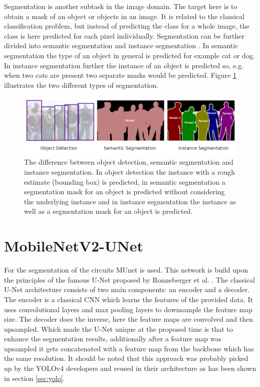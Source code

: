 \label{sec:segmentation}

Segmentation is another subtask in the image domain.
The target here is to obtain a mask of an object or objects in an image.
It is related to the classical classification problem, but instead of predicting the class for a whole image, the class is here predicted for each pixel individually.
Segmentation can be further divided into semantic segmentation \cite{semantic_segmentation} and instance segmentation \cite{mask_rcnn}.
In semantic segmentation the type of an object in general is predicted for example cat or dog.
In instance segmentation further the instance of an object is predicted so, e.g. when two cats are present two separate masks would be predicted.
Figure \ref{fig:instance_vs_semantic} illustrates the two different types of segmentation.

\begin{figure}
\begin{center}
    \includegraphics[width=16cm]{imgs/instance_vs_semantic_seg.png}
    \caption{The difference between object detection, semantic segmentation and instance segmentation. In object detection the instance with a rough estimate (bounding box) is predicted, in semantic segmentation a segmentation mask for an object is predicted without considering the underlying instance and in instance segmentation the instance as well as a segmentation mask for an object is predicted. \cite{instance_vs_semantic_fig}}
    \label{fig:instance_vs_semantic}
\end{center}
\end{figure}

\section{MobileNetV2-UNet}
\label{sec:mobilenetv2_unet}

For the segmentation of the circuits \ac{MUnet} \cite{mobile_unet} is used.
This network is build upon the principles of the famous U-Net proposed by Ronneberger et al. \cite{unet}.
The classical U-Net architecture consists of two main components: an encoder and a decoder.
The encoder is a classical \ac{CNN} which learns the features of the provided data.
It uses convolutional layers and max pooling layers to downsample the feature map size.
The decoder does the inverse, here the feature maps are convolved and then upsampled.
Which made the U-Net unique at the proposed time is that to enhance the segmentation results, additionally after a feature map was upsampled it gets concatenated with a feature map from the backbone which has the same resolution.
It should be noted that this approach was probably picked up by the \ac{YOLOv4} developers and reused in their architecture as has been shown in section \ref{sec:yolo}.


